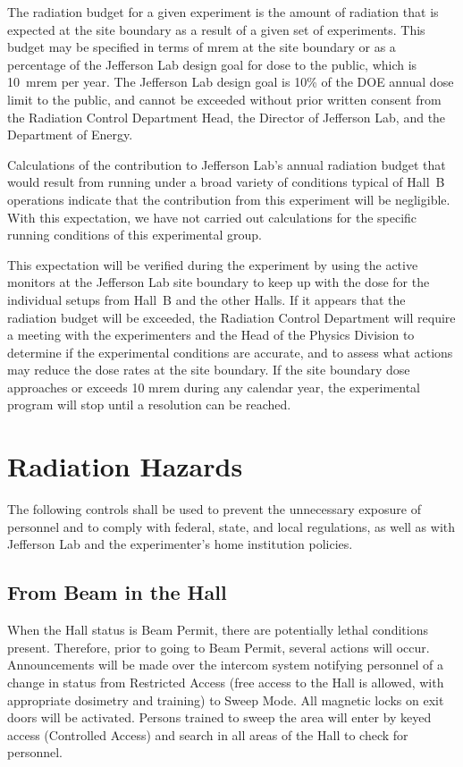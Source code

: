 \documentclass [12pt]{article}
\begin{document}
The radiation budget for a given experiment is the amount of radiation that is expected at the 
site boundary as a result of a given set of experiments. This budget may be specified in terms 
of mrem at the site boundary or as a percentage of the Jefferson Lab design goal for dose to the 
public, which is 10~mrem per year. The Jefferson Lab design goal is 10\% of the DOE annual dose 
limit to the public, and cannot be exceeded without prior written consent from the Radiation 
Control Department Head, the Director of Jefferson Lab, and the Department of Energy. 

Calculations of the contribution to Jefferson Lab's annual radiation budget that would result 
from running under a broad variety of conditions typical of Hall~B operations indicate that 
the contribution from this experiment will be negligible. With this expectation, we have not 
carried out calculations for the specific running conditions of this experimental group. 

This expectation will be verified during the experiment by using the active monitors at the 
Jefferson Lab site boundary to keep up with the dose for the individual setups from Hall~B and 
the other Halls. If it appears that the radiation budget will be exceeded, the Radiation
Control Department will require a meeting with the experimenters and the Head of the 
Physics Division to determine if the experimental conditions are accurate, and to assess what 
actions may reduce the dose rates at the site boundary. If the site boundary dose approaches or
exceeds 10 mrem during any calendar year, the experimental program will stop until a resolution 
can be reached. 

\section{Radiation Hazards}
\indent

The following controls shall be used to prevent the unnecessary exposure of personnel and to 
comply with federal, state, and local regulations, as well as with Jefferson Lab and the 
experimenter's home institution policies. 

\subsection{From Beam in the Hall}

When the Hall status is Beam Permit, there are potentially lethal conditions present. Therefore, 
prior to going to Beam Permit, several actions will occur. Announcements will be made over the 
intercom system notifying personnel of a change in status from Restricted Access (free access 
to the Hall is allowed, with appropriate dosimetry and training) to Sweep Mode. All magnetic 
locks on exit doors will be activated. Persons trained to sweep the area will enter by keyed
access (Controlled Access) and search in all areas of the Hall to check for personnel. 
\end{document}
